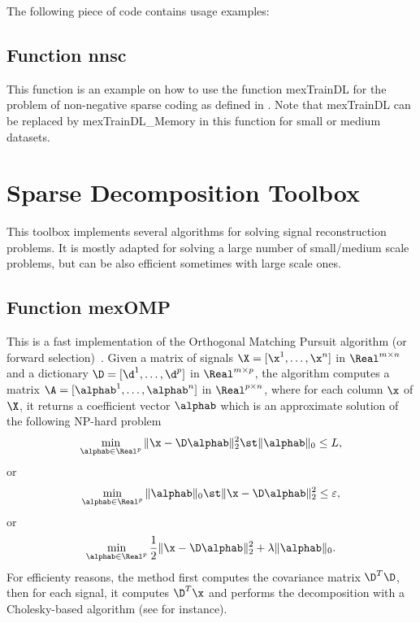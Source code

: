 \documentclass[a4paper, 11pt]{article}
\begin{document}
%    

The following piece of code contains usage examples:


\subsection{Function nnsc}
This function is an example on how to use the function mexTrainDL for the
problem of non-negative sparse coding as defined in \cite{hoyer}.  Note that
mexTrainDL can be replaced by mexTrainDL\_Memory in this function for small or
medium datasets.

%    

% 



\section{Sparse Decomposition Toolbox}
This toolbox implements several algorithms for solving signal reconstruction problems. It is mostly adapted for solving a large number of small/medium scale problems, but can be also efficient sometimes with large scale ones.
\subsection{Function mexOMP}
This is a fast implementation of the Orthogonal Matching Pursuit algorithm (or forward selection)~\cite{mallat4,weisberg}. Given a matrix of signals $\X=[\x^1,\ldots,\x^n]$  in $\Real^{m \times n}$ and a dictionary $\D=[\d^1,\ldots,\d^p]$ in $\Real^{m \times p}$, the algorithm computes a matrix $\A=[\alphab^1,\ldots,\alphab^n]$ in $\Real^{p \times n}$,
     where for each column $\x$ of $\X$, it returns a coefficient vector $\alphab$ which is an approximate solution of the following NP-hard problem
     \begin{equation}
     \min_{\alphab \in \Real^p} \|\x-\D\alphab\|_2^2 \st \|\alphab\|_0 \leq L,
     \end{equation}
     or 
     \begin{equation}
     \min_{\alphab \in \Real^p}  \|\alphab\|_0 \st \|\x-\D\alphab\|_2^2 \leq \varepsilon,
     \end{equation}
     or
     \begin{equation}
     \min_{\alphab \in \Real^p} \frac{1}{2}\|\x-\D\alphab\|_2^2 + \lambda \|\alphab\|_0.
     \end{equation}
     For efficienty reasons, the method first computes the covariance matrix
     $\D^T\D$, then for each signal, it computes $\D^T\x$ and performs the
     decomposition with a Cholesky-based algorithm (see \cite{cotter} for instance).
\end{document}
